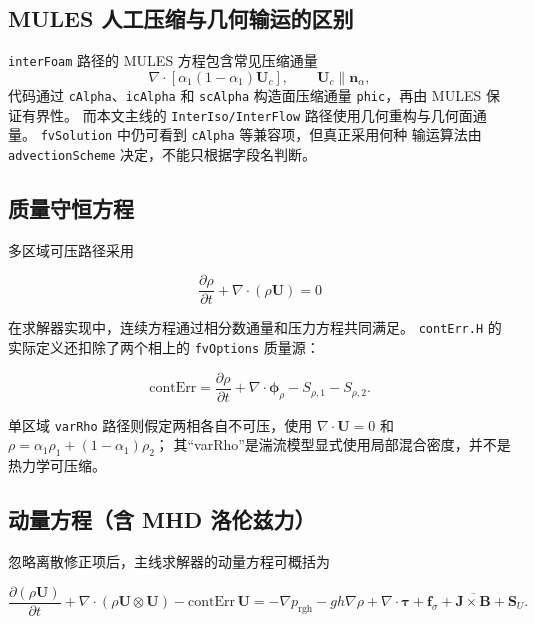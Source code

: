 \documentclass[11pt,a4paper]{article}
\begin{document}
\subsection{MULES 人工压缩与几何输运的区别}

\texttt{interFoam} 路径的 MULES 方程包含常见压缩通量
\begin{equation}
\nabla\cdot\left[
\alpha_1(1-\alpha_1)\mathbf{U}_c
\right],
\qquad
\mathbf{U}_c \parallel \mathbf{n}_\alpha ,
\end{equation}
代码通过 \texttt{cAlpha}、\texttt{icAlpha} 和 \texttt{scAlpha}
构造面压缩通量 \texttt{phic}，再由 MULES 保证有界性。
而本文主线的 \texttt{InterIso/InterFlow} 路径使用几何重构与几何面通量。
\texttt{fvSolution} 中仍可看到 \texttt{cAlpha} 等兼容项，但真正采用何种
输运算法由 \texttt{advectionScheme} 决定，不能只根据字段名判断。

\subsection{质量守恒方程}

多区域可压路径采用

\begin{equation}
\frac{\partial \rho}{\partial t} + \nabla \cdot (\rho \mathbf{U}) = 0
\label{eq:continuity}
\end{equation}

在求解器实现中，连续方程通过相分数通量和压力方程共同满足。
\texttt{contErr.H} 的实际定义还扣除了两个相上的 \texttt{fvOptions}
质量源：

\begin{equation}
\mathrm{contErr} =
\frac{\partial \rho}{\partial t}
+\nabla\cdot\boldsymbol{\phi}_\rho
-S_{\rho,1}-S_{\rho,2}.
\end{equation}

单区域 \texttt{varRho} 路径则假定两相各自不可压，使用
$\nabla\cdot\mathbf{U}=0$ 和
$\rho=\alpha_1\rho_1+(1-\alpha_1)\rho_2$；
其“varRho”是湍流模型显式使用局部混合密度，并不是热力学可压缩。

\subsection{动量方程（含 MHD 洛伦兹力）}

忽略离散修正项后，主线求解器的动量方程可概括为

\begin{equation}
\frac{\partial (\rho \mathbf{U})}{\partial t}
+\nabla \cdot (\rho \mathbf{U} \otimes \mathbf{U})
-\mathrm{contErr}\,\mathbf{U}
=-\nabla p_{\text{rgh}}
-gh\nabla \rho
+\nabla \cdot \bm{\tau}
+\mathbf{f}_\sigma
+\overline{\mathbf{J}\times\mathbf{B}}
+\mathbf{S}_U .
\label{eq:UEqn}
\end{equation}
\end{document}
